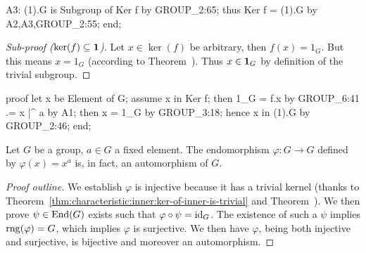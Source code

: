   A3: (1).G is Subgroup of Ker f by GROUP_2:65;
  thus Ker f = (1).G by A2,A3,GROUP_2:55;
end;
\eatline
{}\nwendcode{}\nwdocspar
\begin{proof}[Sub-proof ($\ker(f)\subseteq\mathbf{1}$)]
Let $x\in\ker(f)$ be arbitrary, then $f(x)=1_{G}$. But this means $x=1_{G}$
(according to Theorem~). Thus
$x\in\mathbf{1}_{G}$ by definition of the trivial subgroup.
\end{proof}

\nwenddocs{}\endmoddef\nwstartdeflinemarkup{}\nwenddeflinemarkup
proof
  let x be Element of G;
  assume x in Ker f;
  then 1_G = f.x by GROUP_6:41
          .= x |^ a by A1;
  then x = 1_G by GROUP_3:18;
  hence x in (1).G by GROUP_2:46;
end;
\nwendcode{}\nwdocspar

\begin{theorem}\label{thm:characteristic:inner:conjugation-by-fixed-element-is-an-automorphism}
Let $G$ be a group, $a\in G$ a fixed element.
The endomorphism $\varphi\colon G\to G$ defined by $\varphi(x)=x^{a}$ is, in fact,
an automorphism of $G$.
\end{theorem}

\begin{proof}[Proof outline]
We establish $\varphi$ is injective because it has a trivial kernel
(thanks to Theorem~\ref{thm:characteristic:inner:ker-of-inner-is-trivial} and
Theorem~).
We then prove $\psi\in\operatorname{End}(G)$ exists such that $\varphi\circ\psi=\operatorname{id}_{G}$.
The existence of such a $\psi$ implies $\operatorname{rng}(\varphi)=G$, which implies
$\varphi$ is surjective. We then have $\varphi$, being both injective
and surjective, is bijective and moreover an automorphism.
\end{proof}

